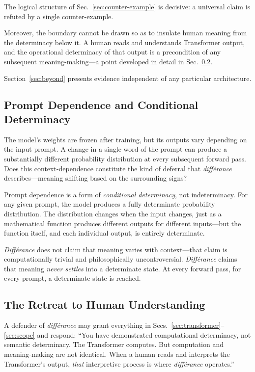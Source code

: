 \documentclass[a4paper,twocolumn,11pt]{article}
\begin{document}
The logical structure of Sec.~\ref{sec:counter-example} is decisive: a universal claim is refuted by a single counter-example.

Moreover, the boundary cannot be drawn so as to insulate human meaning from the determinacy below it. A human reads and understands Transformer output, and the operational determinacy of that output is a precondition of any subsequent meaning-making---a point developed in detail in Sec.~\ref{sec:retreat}.

Section~\ref{sec:beyond} presents evidence independent of any particular architecture.

\subsection{Prompt Dependence and Conditional Determinacy}
\label{sec:prompt}

The model's weights are frozen after training, but its outputs vary depending on the input prompt. A change in a single word of the prompt can produce a substantially different probability distribution at every subsequent forward pass. Does this context-dependence constitute the kind of deferral that \emph{diff\'erance} describes---meaning shifting based on the surrounding signs?

Prompt dependence is a form of \emph{conditional determinacy}, not indeterminacy. For any given prompt, the model produces a fully determinate probability distribution. The distribution changes when the input changes, just as a mathematical function produces different outputs for different inputs---but the function itself, and each individual output, is entirely determinate.

\emph{Diff\'erance} does not claim that meaning varies with context---that claim is computationally trivial and philosophically uncontroversial. \emph{Diff\'erance} claims that meaning \emph{never settles} into a determinate state. At every forward pass, for every prompt, a determinate state is reached.

\subsection{The Retreat to Human Understanding}
\label{sec:retreat}

A defender of \emph{diff\'erance} may grant everything in Secs.~\ref{sec:transformer}--\ref{sec:scope} and respond: ``You have demonstrated computational determinacy, not semantic determinacy. The Transformer computes. But computation and meaning-making are not identical. When a human reads and interprets the Transformer's output, \emph{that} interpretive process is where \emph{diff\'erance} operates.''
\end{document}
